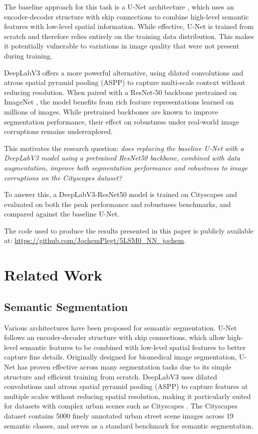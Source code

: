 \documentclass[conference]{IEEEtran}
\begin{document}
The baseline approach for this task is a U-Net architecture \cite{ronneberger2015unet}, which uses an encoder-decoder structure with skip connections to combine high-level semantic features with low-level spatial information. While effective, U-Net is trained from scratch and therefore relies entirely on the training data distribution. This makes it potentially vulnerable to variations in image quality that were not present during training.

DeepLabV3 \cite{chen2017deeplab} offers a more powerful alternative, using dilated convolutions and atrous spatial pyramid pooling (ASPP) to capture multi-scale context without reducing resolution. When paired with a ResNet-50 backbone \cite{he2016resnet} pretrained on ImageNet \cite{russakovsky2015imagenet}, the model benefits from rich feature representations learned on millions of images. While pretrained backbones are known to improve segmentation performance, their effect on robustness under real-world image corruptions remains underexplored.

This motivates the research question: \textit{does replacing the baseline U-Net with a DeepLabV3 model using a pretrained ResNet50 backbone, combined with data augmentation, improve both segmentation performance and robustness to image corruptions on the Cityscapes dataset?}

To answer this, a DeepLabV3-ResNet50 model is trained on Cityscapes \cite{cordts2016cityscapes} and evaluated on both the peak performance and robustness benchmarks, and compared against the baseline U-Net.

The code used to produce the results presented in this paper is publicly available at: \url{https://github.com/JochemPlegt/5LSM0_NN_jochem}.


\section{Related Work}

\subsection{Semantic Segmentation}
Various architectures have been proposed for semantic segmentation. U-Net \cite{ronneberger2015unet} follows an encoder-decoder structure with skip connections, which allow high-level semantic features to be combined with low-level spatial features to better capture fine details. Originally designed for biomedical image segmentation, U-Net has proven effective across many segmentation tasks due to its simple structure and efficient training from scratch. DeepLabV3 \cite{chen2017deeplab} uses dilated convolutions and atrous spatial pyramid pooling (ASPP) to capture features at multiple scales without reducing spatial resolution, making it particularly suited for datasets with complex urban scenes such as Cityscapes \cite{cordts2016cityscapes}. The Cityscapes dataset contains 5000 finely annotated urban street scene images across 19 semantic classes, and serves as a standard benchmark for semantic segmentation.
\end{document}
